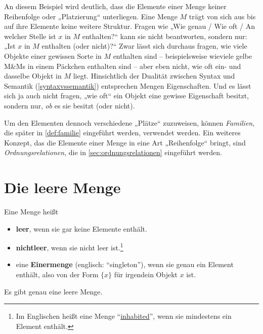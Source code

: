 \begin{bem} \label{mengenstrukturlos}
    An diesem Beispiel wird deutlich, dass die Elemente einer Menge keiner Reihenfolge oder „Platzierung“ unterliegen. Eine Menge $M$ trägt von sich aus bis auf ihre Elemente keine weitere Struktur. Fragen wie „Wie genau / Wie oft / An welcher Stelle ist $x$ in $M$ enthalten?“ kann sie nicht beantworten, sondern nur: „Ist $x$ in $M$ enthalten (oder nicht)?“ Zwar lässt sich durchaus fragen, wie viele Objekte einer gewissen Sorte in $M$ enthalten sind -- beispielsweise wieviele gelbe M\&Ms in einem Päckchen enthalten sind -- aber eben nicht, wie oft ein- und dasselbe Objekt in $M$ liegt. Hinsichtlich der Dualität zwischen Syntax und Semantik (\cref{syntaxvssemantik}) entsprechen Mengen Eigenschaften. Und es lässt sich ja auch nicht fragen, „wie oft“ ein Objekt eine gewisse Eigenschaft besitzt, sondern nur, \emph{ob} es sie besitzt (oder nicht).
    
    Um den Elementen dennoch verschiedene „Plätze“ zuzuweisen, können \emph{Familien}, die später in \cref{def:familie} eingeführt werden, verwendet werden. Ein weiteres Konzept, das die Elemente einer Menge in eine Art „Reihenfolge“ bringt, sind \emph{Ordnungsrelationen}, die in \cref{sec:ordnungsrelationen} eingeführt werden.
\end{bem}





\section{Die leere Menge}


\begin{defin}  
    Eine Menge heißt
    \begin{itemize}
        \item \textbf{leer}, wenn sie gar keine Elemente enthält.
        \item \textbf{nichtleer}, wenn sie nicht leer ist.\footnote{Im Englischen heißt eine Menge ``\href{https://en.wikipedia.org/wiki/Inhabited_set}{inhabited}'', wenn sie mindestens ein Element enthält.}
        \item eine \textbf{Einermenge} (englisch: ``singleton''), wenn sie genau ein Element enthält, also von der Form $\{x\}$ für irgendein Objekt $x$ ist.
    \end{itemize}
\end{defin}


\begin{satz} \label{leeremengeeind}
    Es gibt genau eine leere Menge.
\end{satz}



